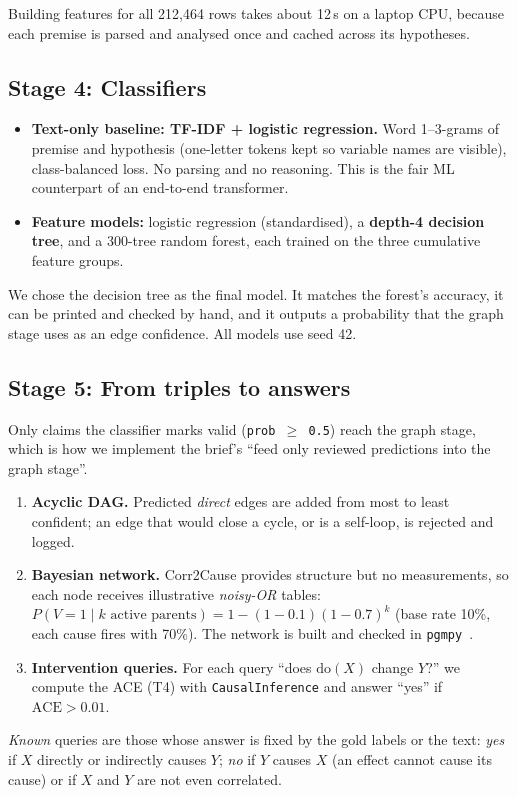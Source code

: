 \documentclass[12pt,a4paper]{article}
\newcommand{\code}[1]{\texttt{#1}}
\newcommand{\doop}{\mathrm{do}}
\begin{document}
Building features for all 212{,}464 rows takes about 12\,s on a laptop CPU, because each premise is parsed and
analysed once and cached across its hypotheses.

\subsection{Stage 4: Classifiers}
\begin{itemize}
  \item \textbf{Text-only baseline: TF-IDF + logistic regression.} Word 1--3-grams of premise and hypothesis
        (one-letter tokens kept so variable names are visible), class-balanced loss. No parsing and no reasoning.
        This is the fair ML counterpart of an end-to-end transformer.
  \item \textbf{Feature models:} logistic regression (standardised), a \textbf{depth-4 decision tree}, and a
        300-tree random forest, each trained on the three cumulative feature groups.
\end{itemize}
We chose the decision tree as the final model. It matches the forest's accuracy, it can be printed and checked by
hand, and it outputs a probability that the graph stage uses as an edge confidence. All models use seed 42.

\subsection{Stage 5: From triples to answers}
Only claims the classifier marks valid (\code{prob\,$\ge$\,0.5}) reach the graph stage, which is how we implement
the brief's ``feed only reviewed predictions into the graph stage''.
\begin{enumerate}
  \item \textbf{Acyclic DAG.} Predicted \emph{direct} edges are added from most to least confident; an edge that
        would close a cycle, or is a self-loop, is rejected and logged.
  \item \textbf{Bayesian network.} Corr2Cause provides structure but no measurements, so each node receives
        illustrative \emph{noisy-OR} tables: $P(V{=}1\mid k \text{ active parents}) = 1-(1-0.1)(1-0.7)^{k}$
        (base rate 10\%, each cause fires with 70\%). The network is built and checked in \texttt{pgmpy}~\cite{ankan2015}.
  \item \textbf{Intervention queries.} For each query ``does $\doop(X)$ change $Y$?'' we compute the ACE (T4) with
        \texttt{CausalInference} and answer ``yes'' if $\mathrm{ACE}>0.01$.
\end{enumerate}
\emph{Known} queries are those whose answer is fixed by the gold labels or the text: \emph{yes} if $X$ directly or
indirectly causes $Y$; \emph{no} if $Y$ causes $X$ (an effect cannot cause its cause) or if $X$ and $Y$ are not even correlated.
\end{document}
